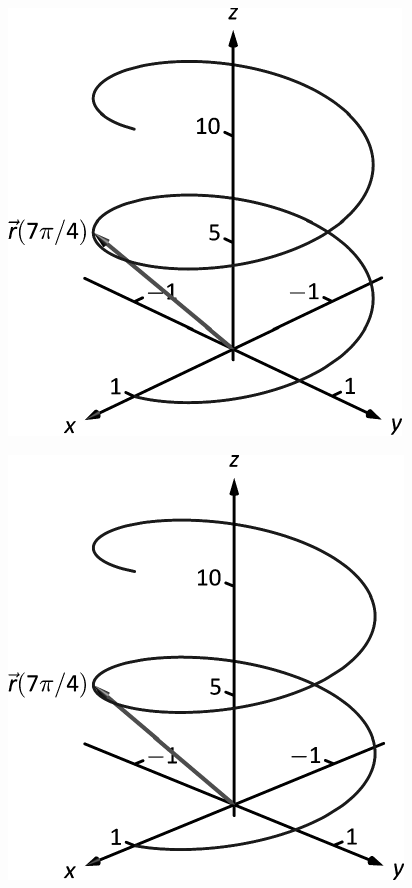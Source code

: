 \documentclass[10pt]{article}
\begin{document}
\includegraphics{figvvf2_3DBW.pdf}
\texttt{}

\includegraphics{figvvf23DBW.pdf}
\texttt{}
\end{document}
